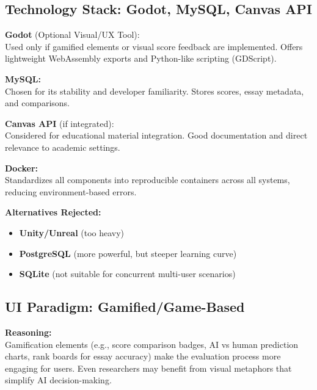 \documentclass[12pt]{article}
\begin{document}
\subsection{Technology Stack: Godot, MySQL, Canvas API}

\textbf{Godot} (Optional Visual/UX Tool):\\
Used only if gamified elements or visual score feedback are implemented. Offers lightweight WebAssembly exports and Python-like scripting (GDScript).

\vspace{1em}

\textbf{MySQL:}\\
Chosen for its stability and developer familiarity. Stores scores, essay metadata, and comparisons.

\vspace{1em}

\textbf{Canvas API} (if integrated):\\
Considered for educational material integration. Good documentation and direct relevance to academic settings.

\vspace{1em}

\textbf{Docker:}\\
Standardizes all components into reproducible containers across all systems, reducing environment-based errors.

\vspace{1em}

\textbf{Alternatives Rejected:}
\begin{itemize}
    \item \textbf{Unity/Unreal} (too heavy)
    \item \textbf{PostgreSQL} (more powerful, but steeper learning curve)
    \item \textbf{SQLite} (not suitable for concurrent multi-user scenarios)
\end{itemize}

\subsection{UI Paradigm: Gamified/Game-Based}

\textbf{Reasoning:}\\
Gamification elements (e.g., score comparison badges, AI vs human prediction charts, rank boards for essay accuracy) make the evaluation process more engaging for users. Even researchers may benefit from visual metaphors that simplify AI decision-making.
\end{document}
